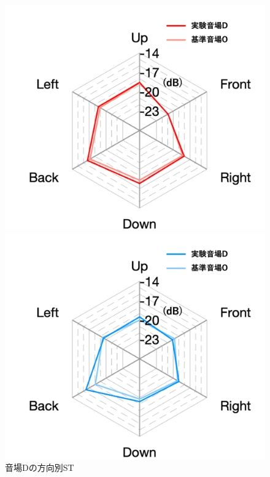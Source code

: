 \documentclass[11pt,a4j]{jreport}
\begin{document}
  \begin{figure}[H]
    \begin{minipage}[b]{.5\linewidth}
        \centering
        \includegraphics[width=1\linewidth]{images/experimentField/withLegend/expDEarly.png}
    \end{minipage}%
    \begin{minipage}[b]{.5\linewidth}
        \centering
        \includegraphics[width=1\linewidth]{images/experimentField/withLegend/expDLate.png}
    \end{minipage}
    \caption{音場Dの方向別ST}
    \label{fig:音場Dの方向別ST}
  \end{figure}





\clearpage


\end{document}

